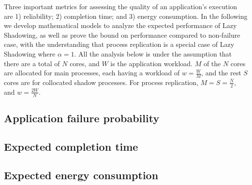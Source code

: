 Three important metrics for assessing the quality of an application's execution are 1) reliability; 2) completion time; and 3) energy consumption. In the following we develop mathematical models to analyze the expected performance of Lazy Shadowing, as well as prove the bound on performance compared to non-failure case, with the understanding
that process replication is a special case of Lazy Shadowing where $\alpha=1$. 
All the analysis below is under the assumption that there are a total of $N$ cores, and $W$ is the application workload.  
$M$ of the $N$ cores are allocated for main processes, each having a workload of $w=\frac{W}{M}$, and the rest $S$ cores are for collocated shadow processes. For process replication,
$M=S=\frac{N}{2}$, and $w=\frac{2W}{N}$. 


\subsection{Application failure probability}
\label{anal_app_fail}


\subsection{Expected completion time}
\label{anal_time}


\subsection{Expected energy consumption}
\label{anal_energy}

